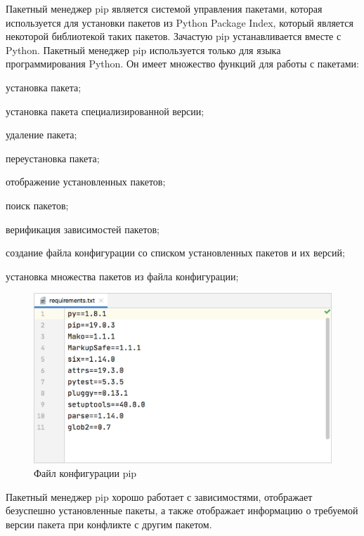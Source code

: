 Пакетный менеджер pip является системой управления пакетами, которая используется для установки пакетов из Python Package Index, который является некоторой библиотекой таких пакетов. Зачастую pip устанавливается вместе с Python. Пакетный менеджер pip используется только для языка программирования Python. 
Он имеет множество функций для работы с пакетами:

\begin{textitemize}
	\item установка пакета;
	\item установка пакета специализированной версии;
	\item удаление пакета;
	\item переустановка пакета;
	\item отображение установленных пакетов;
	\item поиск пакетов;
	\item верификация зависимостей пакетов;
	\item создание файла конфигурации со списком установленных пакетов и их версий;
	\item установка множества пакетов из файла конфигурации;
\end{textitemize}

\begin{figure}[H]
	\includegraphics[scale=0.3]{author/part5/figures/pip.png}
	\caption{Файл конфигурации pip}
	\label{fig:pip}
\end{figure}

Пакетный менеджер pip хорошо работает с зависимостями, отображает безуспешно установленные пакеты, а также отображает информацию о требуемой версии пакета при конфликте с другим пакетом.


